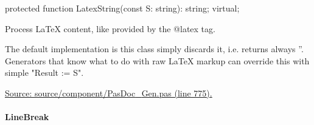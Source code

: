 \documentclass{report}
\newif\ifpdf
\begin{document}
\label{PasDoc_Gen.TDocGenerator-LatexString}
\begin{list}{}{
\setlength{\itemindent}{0cm}
\setlength{\listparindent}{0cm}
\setlength{\leftmargin}{\evensidemargin}
\addtolength{\leftmargin}{\tmplength}
\settowidth{\labelsep}{X}
\addtolength{\leftmargin}{\labelsep}
\setlength{\labelwidth}{\tmplength}
}
\item[\textbf{Declaration}\hfill]
\ifpdf
\begin{flushleft}
\fi
\begin{ttfamily}
protected function LatexString(const S: string): string; virtual;\end{ttfamily}

\ifpdf
\end{flushleft}
\fi

\par
\item[\textbf{Description}]
Process LaTeX content, like provided by the @latex tag.

The default implementation is this class simply discards it, i.e. returns always ''. Generators that know what to do with raw LaTeX markup can override this with simple "Result := S".\par
\href{https://github.com/pasdoc/pasdoc/blob/master/source/component/PasDoc_Gen.pas#L775}{Source: source/component/PasDoc{\_}Gen.pas (line 775).}

\end{list}
\paragraph*{LineBreak}\hspace*{\fill}
\end{document}
